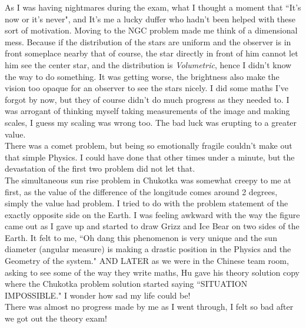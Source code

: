 \documentclass[11pt,a4paper]{article}
\begin{document}
As I was having nightmares during the exam, what I thought a moment that ``It's now or it's never", and It's me a lucky duffer who hadn't been helped with these sort of motivation. Moving to the NGC problem made me think of a dimensional mess. Because if the distribution of the stars are uniform and the observer is in front someplace nearby that of course, the star directly in front of him cannot let him see the center star, and the distribution is \emph{Volumetric}, hence I didn't know the way to do something. It was getting worse, the brightness also make the vision too opaque for an observer to see the stars nicely. I did some maths I've forgot by now, but they of course didn't do much progress as they needed to. I was arrogant of thinking myself taking measurements of the image and making scales, I guess my scaling was wrong too. The bad luck was erupting to a greater value.
\\
There was a comet problem, but being so emotionally fragile couldn't make out that simple Physics. I could have done that other times under a minute, but the devastation of the first two problem did not let that. \\

The simultaneous sun rise problem in Chukotka was somewhat creepy to me at first, as the value of the difference of the longitude comes around 2 degrees, simply the value had problem. I tried to do with the problem statement of the exactly opposite side on the Earth. I was feeling awkward with the way the figure came out as I gave up and started to draw Grizz and Ice Bear on two sides of the Earth. It felt to me, ``Oh dang this phenomenon is very unique and the sun diameter (angular measure) is making a drastic position in the Physics and the Geometry of the system." AND LATER as we were in the Chinese team room, asking to see some of the way they write maths, Hu gave his theory solution copy where the Chukotka problem solution started saying ``SITUATION IMPOSSIBLE." I wonder how sad my life could be!\\
There was almost no progress made by me as I went through, I felt so bad after we got out the theory exam!
\end{document}
